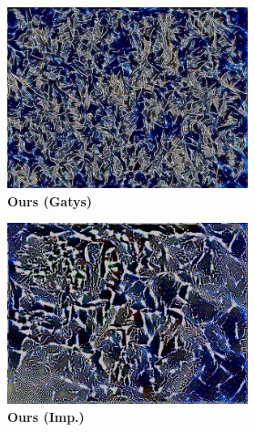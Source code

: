 \begin{figure}[]
\begin{subfigure}{\textwidth}
\begin{subfigure}{0.19\textwidth}
            \centering
            \includegraphics[width=\textwidth]{images/04-experiment02/isolating_issues/190_gatys.jpg}
            \caption*{\textbf{Ours (Gatys)}}
        \end{subfigure}
        \hfill
        \begin{subfigure}{0.19\textwidth}
            \centering
            \includegraphics[width=\textwidth]{images/04-experiment02/isolating_issues/190_improved.jpg}
            \caption*{\textbf{Ours (Imp.)}}
        \end{subfigure}
        \hfill
        \begin{subfigure}{0.19\textwidth}

\end{subfigure}
\end{subfigure}
\end{figure}

